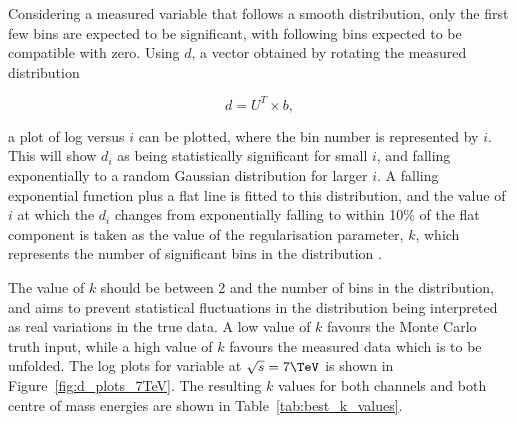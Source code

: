 Considering a measured variable that follows a smooth distribution, %
only the first few bins are expected to be significant, with following bins expected to be compatible with
zero. Using $d$, a vector obtained by rotating the measured distribution

\begin{equation}
d = U^{T}\times{b},
\label{eq:d}
\end{equation}

a plot of log versus $i$ can be plotted, where the bin number
is represented by $i$. This will show $d_{i}$ as being statistically significant for small $i$, and falling exponentially to a random Gaussian
distribution for larger $i$. A falling exponential function plus a flat line is fitted to this distribution,
and the value of $i$ at which the $d_{i}$ changes from exponentially falling to within 10\% of the flat
component is taken as the value of the regularisation parameter, $k$, which represents the number of
significant bins in the distribution \cite{Hocker:1995kb}.

The value of $k$ should be between 2 and the number of bins in the distribution, and aims to prevent
statistical fluctuations in the distribution being interpreted as real variations in the true data. A low
value of $k$ favours the Monte Carlo truth input, while a high value of $k$ favours the measured data which is
to be unfolded. The log plots for \met variable at $\sqrt{s}=7\TeV$ is shown in
Figure~\ref{fig:d_plots_7TeV}. The resulting $k$ values for both channels and both centre of mass energies are
shown in Table~\ref{tab:best_k_values}.

